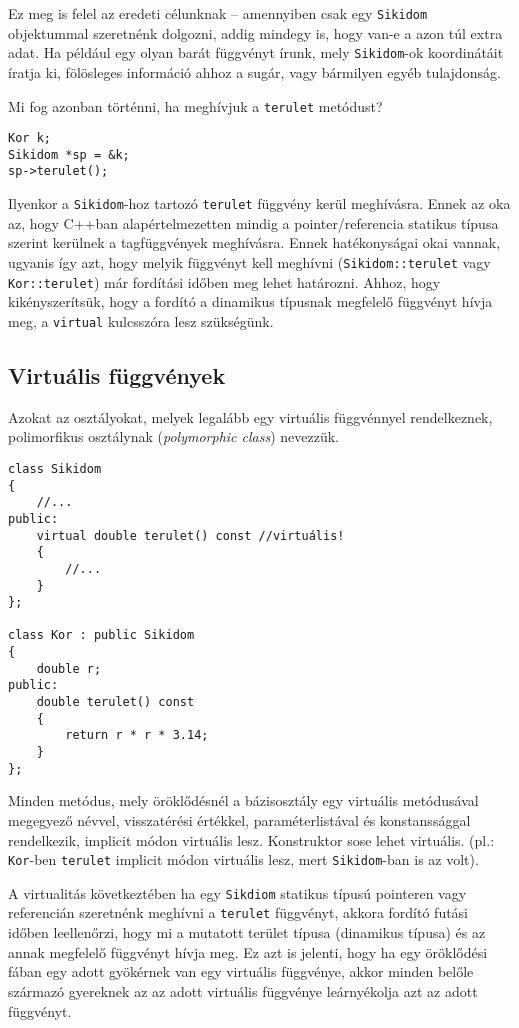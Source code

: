 \documentclass[a4paper,11.5pt,table]{article}
\begin{document}
	Ez meg is felel az eredeti célunknak -- amennyiben csak egy \texttt{Sikidom} objektummal szeretnénk dolgozni, addig mindegy is, hogy van-e a azon túl extra adat. Ha például egy olyan barát függvényt írunk, mely \texttt{Sikidom}-ok koordinátáit íratja ki, fölösleges információ ahhoz a sugár, vagy bármilyen egyéb tulajdonság.
	
	Mi fog azonban történni, ha meghívjuk a \texttt{terulet} metódust?
	\begin{lstlisting}
Kor k;
Sikidom *sp = &k;
sp->terulet();
	\end{lstlisting}
	Ilyenkor a \texttt{Sikidom}-hoz tartozó \texttt{terulet} függvény kerül meghívásra. Ennek az oka az, hogy C++ban alapértelmezetten mindig a pointer/referencia statikus típusa szerint kerülnek a tagfüggvények meghívásra. Ennek hatékonyságai okai vannak, ugyanis így azt, hogy melyik függvényt kell meghívni (\texttt{Sikidom::terulet} vagy \texttt{Kor::terulet}) már fordítási időben meg lehet határozni. Ahhoz, hogy kikényszerítsük, hogy a fordító a dinamikus típusnak megfelelő függvényt hívja meg, a \texttt{virtual} kulcsszóra lesz szükségünk.
	\subsection{Virtuális függvények}
	Azokat az osztályokat, melyek legalább egy virtuális függvénnyel rendelkeznek, polimorfikus osztálynak (\textit{polymorphic class}) nevezzük.
\begin{lstlisting}
class Sikidom
{
	//...
public:
	virtual double terulet() const //virtuális!
	{
		//...
	}
};

class Kor : public Sikidom
{
	double r;
public:
	double terulet() const
	{
		return r * r * 3.14;
	}
};
\end{lstlisting}
	Minden metódus, mely öröklődésnél a bázisosztály egy virtuális metódusával megegyező névvel, visszatérési értékkel, paraméterlistával és konstanssággal rendelkezik, implicit módon virtuális lesz. Konstruktor sose lehet virtuális. (pl.: \texttt{Kor}-ben \texttt{terulet} implicit módon virtuális lesz, mert \texttt{Sikidom}-ban is az volt).
	
	\smallskip
	A virtualitás következtében ha egy \texttt{Sikdiom} statikus típusú pointeren vagy referencián szeretnénk meghívni a \texttt{terulet} függvényt, akkora  fordító futási időben leellenőrzi, hogy mi a mutatott terület típusa (dinamikus típusa) és az annak megfelelő függvényt hívja meg. Ez azt is jelenti, hogy ha egy öröklődési fában egy adott gyökérnek van egy virtuális függvénye, akkor minden belőle származó gyereknek az az adott virtuális függvénye leárnyékolja azt az adott függvényt.
\end{document}
